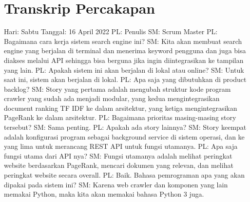 \appendix 
\chapter{Transkrip Percakapan}
\begin{flushleft}
Hari: Sabtu
\linebreak
Tanggal: 16 April 2022
\linebreak
PL: Penulis
\linebreak
SM: Scrum Master
\linebreak
\linebreak
PL: Bagaimana cara kerja sistem search engine ini?
\linebreak
SM: Kita akan membuat search engine yang berjalan di terminal dan menerima keyword pengguna dan juga bisa diakses melalui API sehingga bisa berguna jika ingin diintegrasikan ke tampilan yang lain.
\linebreak
PL: Apakah sistem ini akan berjalan di lokal atau online?
\linebreak
SM: Untuk saat ini, sistem akan berjalan di lokal.
\linebreak
PL: Apa saja yang dibutuhkan di product backlog?
\linebreak
SM: Story yang pertama adalah mengubah struktur kode program crawler yang sudah ada menjadi modular, yang kedua mengintegrasikan document ranking TF IDF ke dalam arsitektur, yang ketiga mengintegrasikan PageRank ke dalam arsitektur.
\linebreak
PL: Bagaimana prioritas masing-masing story tersebut?
\linebreak
SM: Sama penting.
\linebreak
PL: Apakah ada story lainnya?
\linebreak
SM: Story keempat adalah konfigurasi program sebagai background service di sistem operasi, dan ke yang lima untuk merancang REST API untuk fungsi utamanya.
\linebreak
PL: Apa saja fungsi utama dari API nya?
\linebreak
SM: Fungsi utamanya adalah melihat peringkat website berdasarkan PageRank, mencari dokumen yang relevan, dan melihat peringkat website secara overall.
\linebreak
PL: Baik. Bahasa pemrograman apa yang akan dipakai pada sistem ini?
\linebreak
SM: Karena web crawler dan komponen yang lain memakai Python, maka kita akan memakai bahasa Python 3 juga.
\end{flushleft}